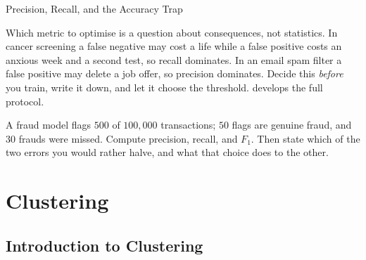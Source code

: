 \begin{v3topic}{Precision, Recall, and the Accuracy Trap}
\begin{engineernote}
Which metric to optimise is a question about consequences, not statistics. In
cancer screening a false negative may cost a life while a false positive costs
an anxious week and a second test, so recall dominates. In an email spam filter
a false positive may delete a job offer, so precision dominates. Decide this
\emph{before} you train, write it down, and let it choose the threshold.
 develops the full protocol.
\end{engineernote}
\end{v3topic}

\begin{checkpoint}
A fraud model flags $500$ of $100{,}000$ transactions; $50$ flags are genuine
fraud, and $30$ frauds were missed. Compute precision, recall, and $F_1$. Then
state which of the two errors you would rather halve, and what that choice does
to the other.
\end{checkpoint}

\section{Clustering}

\subsection{Introduction to Clustering}

